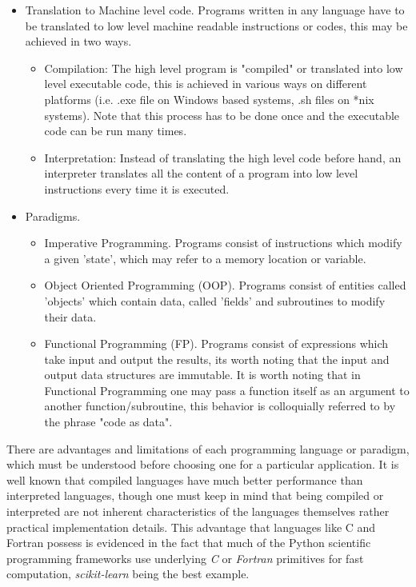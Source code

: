 \begin{itemize}
\item Translation to Machine level code.
Programs written in any language have to be translated to low level machine readable instructions or codes, this may be achieved in two ways.
\begin{itemize}
\item Compilation: The high level program is "compiled" or translated into low level executable code, this is achieved in various ways on different platforms (i.e. .exe file on Windows based systems, .sh files on *nix systems). Note that this process has to be done once and the executable code can be run many times.

\item Interpretation: Instead of translating the high level code before hand, an interpreter translates all the content of a program into low level instructions every time it is executed.

\end{itemize}

\item Paradigms.

\begin{itemize}
\item Imperative Programming.
Programs consist of instructions which modify a given 'state', which may refer to a memory location or variable.
\item Object Oriented Programming (OOP).
Programs consist of entities called 'objects' which contain data, called 'fields' and subroutines to modify their data.
\item Functional Programming (FP).
Programs consist of expressions which take input and output the results, its worth noting that the input and output data structures are immutable. It is worth noting that in Functional Programming one may pass a function itself as an argument to another function/subroutine, this behavior is colloquially referred to by the phrase "code as data". 
\end{itemize}
\end{itemize}

There are advantages and limitations of each programming language or paradigm, which must be understood before choosing one for a particular application. It is well known that compiled languages have much better performance than interpreted languages, though one must keep in mind that being compiled or interpreted are not inherent characteristics of the languages themselves rather practical implementation details. This advantage that languages like C and Fortran possess is evidenced in the fact that much of the Python scientific programming frameworks use underlying \textit{C} or \textit{Fortran} primitives for fast computation, \textit{scikit-learn} \cite{scikit-learn} being the best example.

